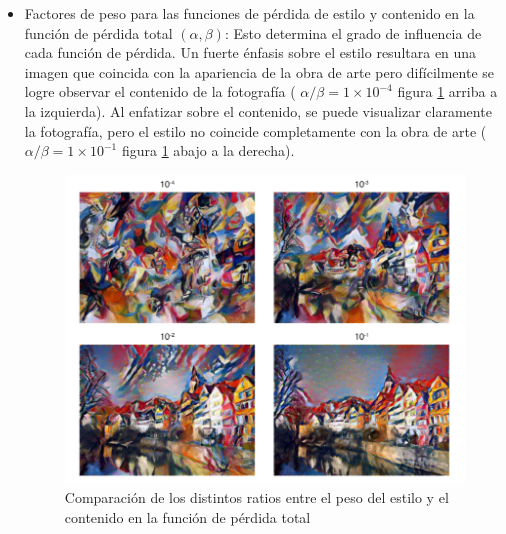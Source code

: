 \documentclass[a4paper,11pt,spanish]{book}
\begin{document}
\begin{itemize}
	 \item Factores de peso para las funciones de pérdida de estilo y contenido en la función de pérdida total $(\alpha, \beta)$: Esto determina el grado de influencia
	  de cada función de pérdida. 
	  Un fuerte énfasis sobre el estilo resultara en una imagen que coincida con la apariencia de la obra de arte pero difícilmente se logre observar el contenido de la fotografía 
	  ( $\alpha / \beta = 1 \times 10^{-4}$ figura \ref{fig:ratio_content_style} arriba a la izquierda). Al enfatizar sobre el contenido, se puede visualizar claramente la fotografía,
	  pero el estilo no coincide completamente con la obra de arte ( $\alpha / \beta = 1 \times 10^{-1}$ figura \ref{fig:ratio_content_style} abajo a la derecha).
	  \begin{figure}[h]
	    \includegraphics[width=\textwidth]{./img/ratio_content_style.png}
	    \caption{Comparación de los distintos ratios entre el peso del estilo y el contenido en la función de pérdida total}
	    \label{fig:ratio_content_style}
	 \end{figure}
	 

\end{itemize}
\end{document}
